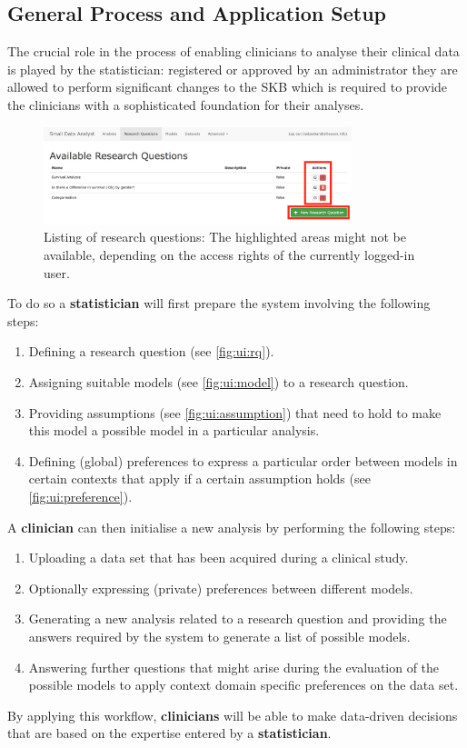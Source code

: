 \subsection{General Process and Application Setup}
\label{sub:process}
The crucial role in the process of enabling clinicians to analyse their clinical data is played by the statistician: registered or approved by an administrator they are allowed to perform significant changes to the \gls{SKB} which is required to provide the clinicians with a sophisticated foundation for their analyses. 

\begin{figure}[htbp]
\centering
\includegraphics[width=0.8\textwidth]{figures/ui_RQ}
\caption{Listing of research questions: The highlighted areas might not be available, depending on the access rights of the currently logged-in user.}
\label{fig:ui:rq}
\end{figure}

To do so a \textbf{statistician} will first prepare the system involving the following steps:

\begin{enumerate}
	\item Defining a research question (see \autoref{fig:ui:rq}).
	\item Assigning suitable models (see \autoref{fig:ui:model}) to a research question.
	\item Providing assumptions (see \autoref{fig:ui:assumption}) that need to hold to make this model a possible model in a particular analysis.
	\item Defining (global) preferences to express a particular order between models in certain contexts that apply if a certain assumption holds (see \autoref{fig:ui:preference}).
\end{enumerate}

\bigskip

A \textbf{clinician} can then initialise a new analysis by performing the following steps:
 
\begin{enumerate}
	\item Uploading a data set that has been acquired during a clinical study.
	\item Optionally expressing (private) preferences between different models.
	\item Generating a new analysis related to a research question and providing the answers required by the system to generate a list of possible models.
	\item Answering further questions that might arise during the evaluation of the possible models to apply context domain specific preferences on the data set.
\end{enumerate}
\bigskip

By applying this workflow, \textbf{clinicians} will be able to make data-driven decisions that are based on the expertise entered by a \textbf{statistician}.
